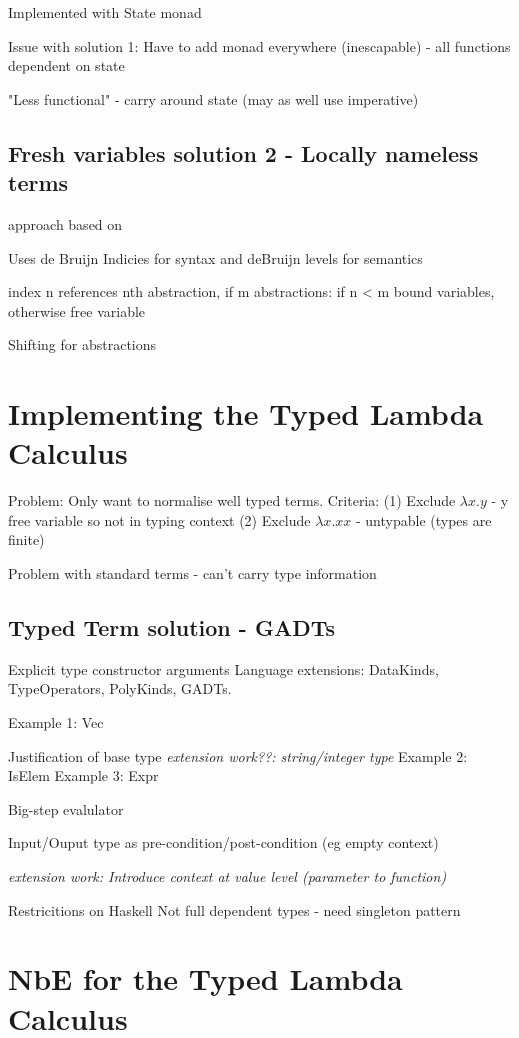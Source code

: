 \documentclass{article}
\begin{document}
Implemented with State monad

Issue with solution 1: Have to add monad everywhere (inescapable) - all functions dependent on state

"Less functional" - carry around state (may as well use imperative)

\subsection{Fresh variables solution 2 - Locally nameless terms}
approach based on \cite{deBruijn}

Uses de Bruijn Indicies for syntax and deBruijn levels for semantics

index n references nth abstraction,
if m abstractions: if n < m bound variables, otherwise free variable

Shifting for abstractions

\section{Implementing the Typed Lambda Calculus}
Problem: Only want to normalise well typed terms.
Criteria: 
(1) Exclude $\lambda x . y$ - y free variable so not in typing context
(2) Exclude $\lambda x.xx$ - untypable (types are finite)

Problem with standard terms - can't carry type information

\subsection{Typed Term solution - GADTs}
\cite{GADTs}
Explicit type constructor arguments
Language extensions:
DataKinds, TypeOperators, PolyKinds, GADTs.

Example 1: Vec 

Justification of base type \textit{extension work??: string/integer type}
Example 2: IsElem
Example 3: Expr

Big-step evalulator

Input/Ouput type as pre-condition/post-condition (eg empty context)

\textit{extension work: Introduce context at value level (parameter to function)} 

Restricitions on Haskell
Not full dependent types - need singleton pattern

\section{NbE for the Typed Lambda Calculus}
\cite{modalTypes}

\printbibliography
\end{document}
